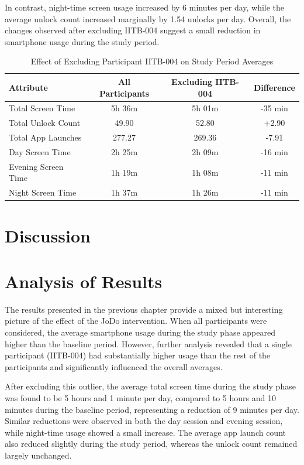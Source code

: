 \documentclass[11pt]{report}
\begin{document}
In contrast, night-time screen usage increased by 6 minutes per day, while the 
average unlock count increased marginally by 1.54 unlocks per day. Overall, the 
changes observed after excluding IITB-004 suggest a small reduction in smartphone 
usage during the study period.


\begin{table}[h]
\centering
\caption{Effect of Excluding Participant IITB-004 on Study Period Averages}
\label{tab:exclude_004_comparison}
\begin{tabular}{|l|c|c|c|}
\hline
\textbf{Attribute} &
\textbf{All Participants} &
\textbf{Excluding IITB-004} &
\textbf{Difference} \\
\hline
Total Screen Time &
5h 36m &
5h 01m &
-35 min \\
\hline
Total Unlock Count &
49.90 &
52.80 &
+2.90 \\
\hline
Total App Launches &
277.27 &
269.36 &
-7.91 \\
\hline
Day Screen Time &
2h 25m &
2h 09m &
-16 min \\
\hline
Evening Screen Time &
1h 19m &
1h 08m &
-11 min \\
\hline
Night Screen Time &
1h 37m &
1h 26m &
-11 min \\
\hline
\end{tabular}
\end{table}

\section{Discussion}

\section{Analysis of Results}

The results presented in the previous chapter provide a mixed but interesting picture 
of the effect of the JoDo intervention. When all participants were considered, 
the average smartphone usage during the study phase appeared higher than the baseline 
period. However, further analysis revealed that a single participant (IITB-004) 
had substantially higher usage than the rest of the participants and significantly 
influenced the overall averages.

After excluding this outlier, the average total screen time during the study phase was 
found to be 5 hours and 1 minute per day, compared to 5 hours and 10 minutes during the 
baseline period, representing a reduction of 9 minutes per day. Similar reductions were 
observed in both the day session and evening session, while night-time usage showed a 
small increase. The average app launch count also reduced slightly during the study period,
 whereas the unlock count remained largely unchanged.
\end{document}
